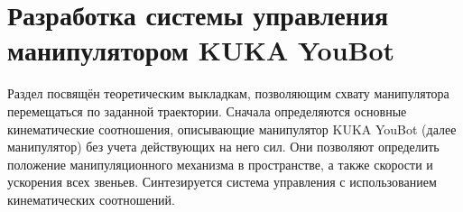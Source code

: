 \section{Разработка системы управления манипулятором KUKA YouBot}\label{part_manipulator}

Раздел посвящён теоретическим выкладкам, позволяющим схвату манипулятора перемещаться по заданной траектории. Сначала определяются основные кинематические соотношения, описывающие манипулятор KUKA YouBot (далее манипулятор) без учета действующих на него сил. Они позволяют определить положение манипуляционного механизма в пространстве, а также скорости и ускорения всех звеньев. Синтезируется система управления с использованием кинематических соотношений.






%
\clearpage\newpage